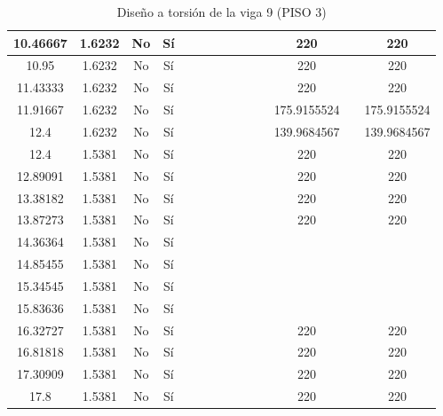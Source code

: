 \begin{table}[H]
{\begin{tabular}{|c|c|c|c|c|c|c|c|c|c|c|c|c|c|}
\hline
10.46667 & 1.6232 & No  & Sí  &     &     &     &     &     &     &     & 220 &     & 220 \bigstrut\\
\hline
10.95 & 1.6232 & No  & Sí  &     &     &     &     &     &     &     & 220 &     & 220 \bigstrut\\
\hline
11.43333 & 1.6232 & No  & Sí  &     &     &     &     &     &     &     & 220 &     & 220 \bigstrut\\
\hline
11.91667 & 1.6232 & No  & Sí  &     &     &     &     &     &     &     & 175.9155524 &     & 175.9155524 \bigstrut\\
\hline
12.4 & 1.6232 & No  & Sí  &     &     &     &     &     &     &     & 139.9684567 &     & 139.9684567 \bigstrut\\
\hline
12.4 & 1.5381 & No  & Sí  &     &     &     &     &     &     &     & 220 &     & 220 \bigstrut\\
\hline
12.89091 & 1.5381 & No  & Sí  &     &     &     &     &     &     &     & 220 &     & 220 \bigstrut\\
\hline
13.38182 & 1.5381 & No  & Sí  &     &     &     &     &     &     &     & 220 &     & 220 \bigstrut\\
\hline
13.87273 & 1.5381 & No  & Sí  &     &     &     &     &     &     &     & 220 &     & 220 \bigstrut\\
\hline
14.36364 & 1.5381 & No  & Sí  &     &     &     &     &     &     &     &     &     &  \bigstrut\\
\hline
14.85455 & 1.5381 & No  & Sí  &     &     &     &     &     &     &     &     &     &  \bigstrut\\
\hline
15.34545 & 1.5381 & No  & Sí  &     &     &     &     &     &     &     &     &     &  \bigstrut\\
\hline
15.83636 & 1.5381 & No  & Sí  &     &     &     &     &     &     &     &     &     &  \bigstrut\\
\hline
16.32727 & 1.5381 & No  & Sí  &     &     &     &     &     &     &     & 220 &     & 220 \bigstrut\\
\hline
16.81818 & 1.5381 & No  & Sí  &     &     &     &     &     &     &     & 220 &     & 220 \bigstrut\\
\hline
17.30909 & 1.5381 & No  & Sí  &     &     &     &     &     &     &     & 220 &     & 220 \bigstrut\\
\hline
17.8 & 1.5381 & No  & Sí  &     &     &     &     &     &     &     & 220 &     & 220 \bigstrut\\
\hline
\end{tabular}%
  }
      \caption{Diseño a torsión de la viga 9 (PISO 3) }
  \label{tab:T VG9 P3 }%
\end{table}%
